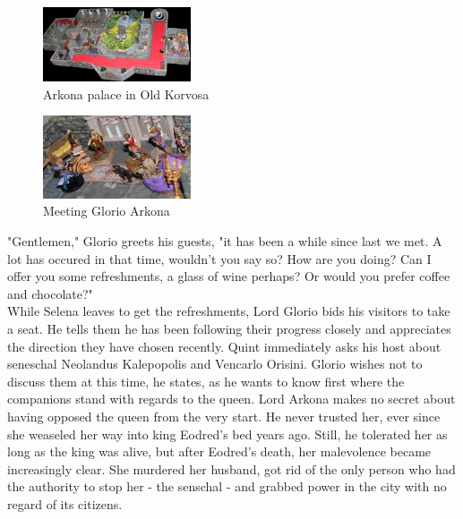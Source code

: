 \begin{figure}[h]
	\centering
	\includegraphics[width=0.39\textwidth]{images/Arkona-palace-in-Old-Korvosa-563928457.jpg}
	\caption{Arkona palace in Old Korvosa}
	\label{fig:Arkona-palace-in-Old-Korvosa-563928457}
\end{figure}

\begin{figure}[h]
	\centering
	\includegraphics[width=0.39\textwidth]{images/Meeting-Glorio-Arkona-563929464.jpg}
	\caption{Meeting Glorio Arkona}
	\label{fig:Meeting-Glorio-Arkona-563929464}
\end{figure}

"Gentlemen," Glorio greets his guests, "it has been a while since last we met. A lot has occured in that time, wouldn't you say so? How are you doing? Can I offer you some refreshments, a glass of wine perhaps? Or would you prefer coffee and chocolate?"\\

While Selena leaves to get the refreshments, Lord Glorio bids his visitors to take a seat. He tells them he has been following their progress closely and appreciates the direction they have chosen recently. Quint immediately asks his host about seneschal Neolandus Kalepopolis and Vencarlo Orisini. Glorio wishes not to discuss them at this time, he states, as he wants to know first where the companions stand with regards to the queen. Lord Arkona makes no secret about having opposed the queen from the very start. He never trusted her, ever since she weaseled her way into king Eodred's bed years ago. Still, he tolerated her as long as the king was alive, but after Eodred's death, her malevolence became increasingly clear. She murdered her husband, got rid of the only person who had the authority to stop her - the senschal - and grabbed power in the city with no regard of its citizens.\\

